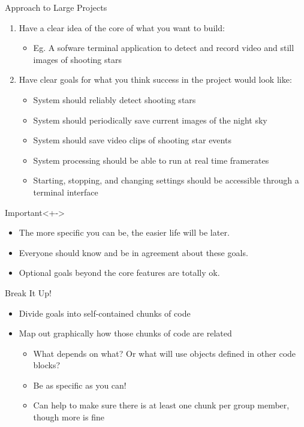 \documentclass[pdf, aspectratio=169, 12pt]{beamer}
\begin{document}
\begin{frame}{Approach to Large Projects}
	\vspace{5mm}
	\begin{enumerate}
		\item<+-> Have a clear idea of the core of what you want to build:
			\begin{itemize}
				\footnotesize
				\item Eg. A sofware terminal application to detect and record video and still images of shooting stars
			\end{itemize}
		\item<+-> Have clear goals for what you think success in the project would look like:
			\begin{itemize}
				\footnotesize
				\item System should reliably detect shooting stars
				\item System should periodically save current images of the night sky
				\item System should save video clips of shooting star events
				\item System processing should be able to run at real time framerates
				\item Starting, stopping, and changing settings should be accessible through a terminal interface
			\end{itemize}
	\end{enumerate}
	\begin{alertblock}{Important}<+->
		\begin{itemize}
			\item The more specific you can be, the easier life will be later.
			\item Everyone should know and be in agreement about these goals.
			\item Optional goals beyond the core features are totally ok.
		\end{itemize}
	\end{alertblock}
\end{frame}

\begin{frame}{Break It Up!}
	\begin{itemize}
		\item Divide goals into self-contained chunks of code
		\item Map out graphically how those chunks of code are related
			\begin{itemize}
				\item What depends on what? Or what will use objects defined in other code blocks?
				\item Be as specific as you can!
				\item Can help to make sure there is at least one chunk per group member, though more is fine
			\end{itemize}
	\end{itemize}
\end{frame}
\end{document}
